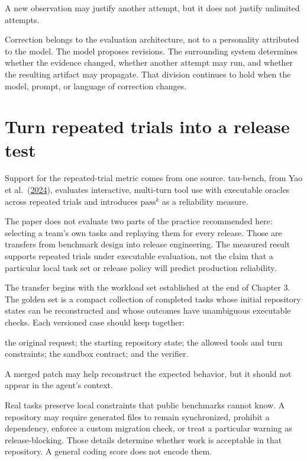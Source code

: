 A new observation may justify another attempt, but it does not justify unlimited attempts.

Correction belongs to the evaluation architecture, not to a personality attributed to the model. The model proposes revisions. The surrounding system determines whether the evidence changed, whether another attempt may run, and whether the resulting artifact may propagate. That division continues to hold when the model, prompt, or language of correction changes.

\hypertarget{turn-repeated-trials-into-a-release-test}{%
\section{Turn repeated trials into a release test}\label{turn-repeated-trials-into-a-release-test}}

Support for the repeated-trial metric comes from one source. tau-bench, from Yao et al.~(\href{https://arxiv.org/abs/2406.12045}{2024}), evaluates interactive, multi-turn tool use with executable oracles across repeated trials and introduces \(\mathrm{pass}^{k}\) as a reliability measure.

The paper does not evaluate two parts of the practice recommended here: selecting a team's own tasks and replaying them for every release. Those are transfers from benchmark design into release engineering. The measured result supports repeated trials under executable evaluation, not the claim that a particular local task set or release policy will predict production reliability.

The transfer begins with the workload set established at the end of Chapter 3. The golden set is a compact collection of completed tasks whose initial repository states can be reconstructed and whose outcomes have unambiguous executable checks. Each versioned case should keep together:

the original request;
the starting repository state;
the allowed tools and turn constraints;
the sandbox contract; and
the verifier.

A merged patch may help reconstruct the expected behavior, but it should not appear in the agent's context.

Real tasks preserve local constraints that public benchmarks cannot know. A repository may require generated files to remain synchronized, prohibit a dependency, enforce a custom migration check, or treat a particular warning as release-blocking. Those details determine whether work is acceptable in that repository. A general coding score does not encode them.

